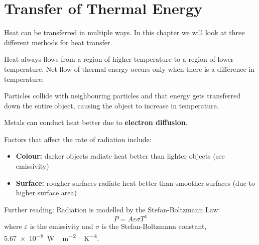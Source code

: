 \documentclass[../main.tex]{subfiles}
\begin{document}
	\section{Transfer of Thermal Energy}
	\begin{preamb}
		Heat can be transferred in multiple ways. In this chapter we will look at three different methods for heat transfer.
	\end{preamb}	
	
	Heat always flows from a region of higher temperature to a region of lower temperature. Net flow of thermal energy occurs only when there is a difference in temperature.
	
	\begin{center}
	\end{center}
	
	
	Particles collide with neighbouring particles and that energy gets transferred down the entire object, causing the object to increase in temperature.
	
	Metals can conduct heat better due to \textbf{electron diffusion}.
	
	
	
	Factors that affect the rate of radiation include:
	\begin{itemize}
		\item \textbf{Colour:} darker objects radiate heat better than lighter objects (see emissivity)
		\item \textbf{Surface:} rougher surfaces radiate heat better than smoother surfaces (due to higher surface area)
	\end{itemize}
	
	Further reading: Radiation is modelled by the Stefan-Boltzmann Law:
		\[ P = A \varepsilon \sigma T^4 \]
	where \(\varepsilon\) is the emissivity and \(\sigma\) is the Stefan-Boltzmann constant, \SI{5.67e-8}{\watt \, \meter^{-2} \, \kelvin^{-4}}.
\end{document}
